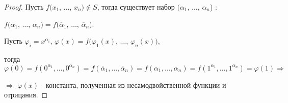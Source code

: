 \documentclass[a4paper, 12pt]{article}
\renewcommand{\phi}{\varphi}
\theoremstyle{definition}
\theoremstyle{plain}
\theoremstyle{remark}
\begin{document}
  \begin{proof}
    Пусть $f(x_1$, $\ldots$, $x_n)\notin S$, тогда существует набор $(\alpha_1$, $\ldots$, $\alpha_n$) :\\ 
    \begin{center}
      $f(\alpha_1$, $\ldots$, $\alpha_n)=f(\overline{\alpha}_1$, $\ldots$, $\overline{\alpha}_n)$.\\
    \end{center} 
    Пусть $\phi_i=x^{\alpha_i}$, $\phi(x)=f(\phi_1(x)$, $\ldots$, $\phi_n(x))$,\\ 
    \begin{center}
      тогда $\phi(0)= f(0^{\alpha_1}, \ldots, 0^{\alpha_n})=f(\overline{\alpha}_1, \ldots, \overline{\alpha}_n)=f(\alpha_1, \ldots, \alpha_n)=f(1^{\alpha_1}, \ldots, 1^{\alpha_n})=\phi(1)\Longrightarrow$\\
    \end{center}
      $\Longrightarrow$ $\phi(x)$ - константа, полученная из несамодвойственной функции и отрицания.
  \end{proof}
\end{document}
